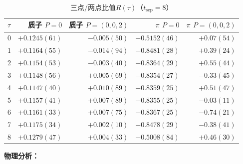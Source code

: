\documentclass[11pt,a4paper]{article}
\newcommand{\tsep}{t_{\mathrm{sep}}}
\begin{document}
\begin{table}[htbp]
\centering
\caption{三点/两点比值$R(\tau)$（$\tsep=8$）}
\label{tab:ratio}
\begin{tabular}{lrrrr}
\toprule
$\tau$ & 质子 $P=0$ & 质子 $P=(0,0,2)$ & $\pi$ $P=0$ & $\pi$ $P=(0,0,2)$ \\
\midrule
0 & $+0.1245(61)$ & $-0.005(50)$ & $-0.5152(46)$ & $+0.07(54)$ \\
1 & $+0.1164(55)$ & $-0.014(94)$ & $-0.8481(28)$ & $+0.39(24)$ \\
2 & $+0.1154(53)$ & $-0.003(40)$ & $-0.8364(29)$ & $+0.55(44)$ \\
3 & $+0.1148(56)$ & $+0.005(69)$ & $-0.8354(27)$ & $-0.33(45)$ \\
4 & $+0.1147(40)$ & $+0.010(89)$ & $-0.8359(25)$ & $+0.51(47)$ \\
5 & $+0.1157(41)$ & $+0.007(89)$ & $-0.8355(25)$ & $-0.03(11)$ \\
6 & $+0.1161(33)$ & $+0.007(75)$ & $-0.8367(25)$ & $-0.74(21)$ \\
7 & $+0.1175(34)$ & $+0.002(10)$ & $-0.8478(29)$ & $-0.38(41)$ \\
8 & $+0.1279(47)$ & $+0.004(33)$ & $-0.5008(84)$ & $+0.46(30)$ \\
\bottomrule
\end{tabular}
\end{table}

\textbf{物理分析：}
\end{document}
